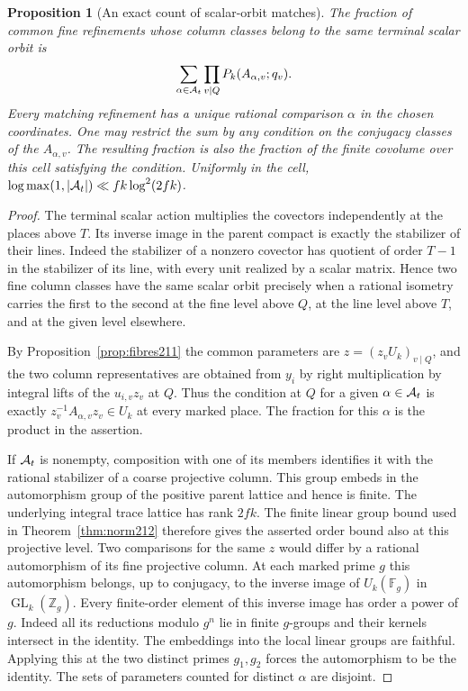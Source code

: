 \documentclass[a4paper,11pt]{article}
\newtheorem{proposition}{Proposition}[section]
\theoremstyle{definition}
\theoremstyle{remark}
\newcommand{\ZZ}{\mathbb Z}\newcommand{\ord}{\operatorname{ord}}
\numberwithin{equation}{section}
\newcommand{\GL}{\operatorname{GL}}
\begin{document}
\begin{proposition}[An exact count of scalar-orbit matches]\leavevmode
\label{prop:loops302}
The fraction of common fine refinements whose column classes
belong to the same terminal scalar orbit is
\[
                    \sum_{\alpha\in{\cal A}_t}
                            \prod_{v\mid Q}P_k(A_{\alpha,v};q_v).
\]
Every matching refinement has a unique rational comparison
\(\alpha\) in the chosen coordinates. One may restrict the
sum by any condition on the conjugacy classes of the
\(A_{\alpha,v}\). The resulting fraction is also the
fraction of the finite covolume over this cell satisfying
the condition. Uniformly in the cell,
\(\log\max(1,|{\cal A}_t|)\ll fk\log^2(2fk)\).
\end{proposition}
\begin{proof}
The terminal scalar action multiplies the covectors independently
at the places above \(T\). Its inverse image in the parent compact
is exactly the stabilizer of their lines. Indeed the stabilizer of
a nonzero covector has quotient of order \(T-1\) in the stabilizer
of its line, with every unit realized by a scalar matrix. Hence
two fine column classes have the same scalar orbit precisely
when a rational isometry carries the first to the second
at the fine level above \(Q\), at the line level above \(T\),
and at the given level elsewhere.

By Proposition~\ref{prop:fibres211} the common parameters
are \(z=(z_vU_k)_{v\mid Q}\), and the two column representatives
are obtained from \(y_i\) by right multiplication by integral
lifts of the \(u_{i,v}z_v\) at \(Q\). Thus the condition at
\(Q\) for a given \(\alpha\in{\cal A}_t\) is exactly
\(z_v^{-1}A_{\alpha,v}z_v\in U_k\) at every marked place.
The fraction for this \(\alpha\) is the product in the assertion.

If \({\cal A}_t\) is nonempty, composition with one of its
members identifies it with the rational stabilizer of a coarse
projective column. This group embeds in the automorphism group
of the positive parent lattice and hence is finite. The
underlying integral trace lattice has rank \(2fk\). The finite
linear group bound used in Theorem~\ref{thm:norm212} therefore
gives the asserted order bound also at this projective level.
Two comparisons for the same \(z\) would differ by a rational
automorphism of its fine projective column. At each marked
prime \(g\) this automorphism belongs, up to conjugacy, to the
inverse image of \(U_k(\mathbb F_g)\) in \(\GL_k(\ZZ_g)\).
Every finite-order element of this inverse image has order a
power of \(g\). Indeed all its reductions modulo \(g^n\)
lie in finite \(g\)-groups and their kernels intersect in the
identity. The embeddings into the local linear groups are
faithful. Applying this at the two distinct primes \(g_1,g_2\)
forces the automorphism to be the identity. The sets of
parameters counted for distinct \(\alpha\) are disjoint.


\end{proof}
\end{document}
